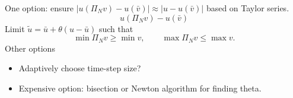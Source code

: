 \documentclass[preprint,10pt]{article}
\theoremstyle{definition}
\theoremstyle{lemma}
\theoremstyle{theorem}
\theoremstyle{assumption}
\newcommand{\LRp}[1]{\left( #1 \right)}
\newcommand{\LRb}[1]{\left| #1 \right|}
\begin{document}
One option: ensure $\LRb{u\LRp{\Pi_N v} - u(\bar{v})} \approx \LRb{u - u(\bar{v})}$ based on Taylor series. 
\[
u\LRp{\Pi_N v} - u(\bar{v})
\]
Limit $\tilde{u} = \bar{u} + \theta(u-\bar{u})$ such that 
\[
\min \Pi_N v \geq \min v, \qquad \max \Pi_N v \leq \max v.
\]
Other options
\begin{itemize}
\item Adaptively choose time-step size?
\item Expensive option: bisection or Newton algorithm for finding theta.  
\end{itemize}





\end{document}
